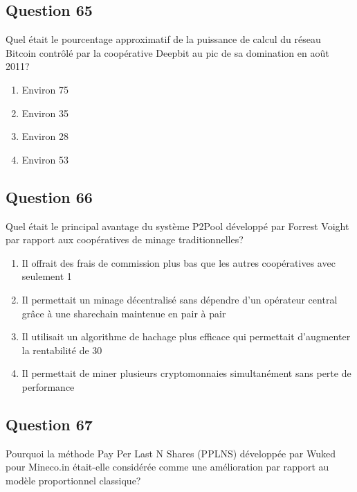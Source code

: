 \documentclass[12pt,a4paper]{article}
\begin{document}
\bigskip


\subsection*{Question 65}
Quel était le pourcentage approximatif de la puissance de calcul du réseau Bitcoin contrôlé par la coopérative Deepbit au pic de sa domination en août 2011?

\begin{enumerate}[label=\Alph*., leftmargin=*]
\item Environ 75%
\item Environ 35%
\item Environ 28%
\item Environ 53%
\end{enumerate}

\bigskip


\subsection*{Question 66}
Quel était le principal avantage du système P2Pool développé par Forrest Voight par rapport aux coopératives de minage traditionnelles?

\begin{enumerate}[label=\Alph*., leftmargin=*]
\item Il offrait des frais de commission plus bas que les autres coopératives avec seulement 1%
\item Il permettait un minage décentralisé sans dépendre d'un opérateur central grâce à une sharechain maintenue en pair à pair
\item Il utilisait un algorithme de hachage plus efficace qui permettait d'augmenter la rentabilité de 30%
\item Il permettait de miner plusieurs cryptomonnaies simultanément sans perte de performance
\end{enumerate}

\bigskip


\subsection*{Question 67}
Pourquoi la méthode Pay Per Last N Shares (PPLNS) développée par Wuked pour Mineco.in était-elle considérée comme une amélioration par rapport au modèle proportionnel classique?
\end{document}

